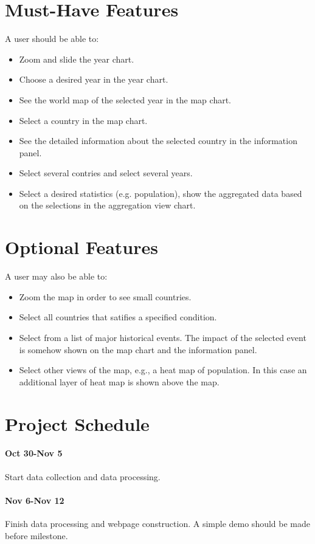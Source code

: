 \documentclass[12pt, fullpage,letterpaper]{article}
\begin{document}
\section{Must-Have Features}
A user should be able to:
\begin{itemize}
    \item Zoom and slide the year chart.
    \item Choose a desired year in the year chart. 
    \item See the world map of the selected year in the map chart.
    \item Select a country in the map chart.
    \item See the detailed information about the selected country in the information panel.
    \item Select several contries and select several years.
    \item Select a desired statistics (e.g. population), show the aggregated data based on the selections in the aggregation view chart.
\end{itemize}

\section{Optional Features}
A user may also be able to:
\begin{itemize}
    \item Zoom the map in order to see small countries.
    \item Select all countries that satifies a specified condition.
    \item Select from a list of major historical events. The impact of the selected event is somehow shown on the map chart and the information panel.
    \item Select other views of the map, e.g., a heat map of population. In this case an additional layer of heat map is shown above the map.
\end{itemize}

\section{Project Schedule}
\paragraph{Oct 30-Nov 5} Start data collection and data processing.
\paragraph{Nov 6-Nov 12} Finish data processing and webpage construction. A simple demo should be made before milestone.
\end{document}
